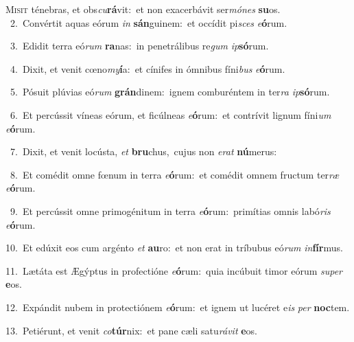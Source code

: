 \lettrine{\initial\textcolor{\initialcolor}{M}}{isit} ténebras, et obs\-\textit{cu}\-\textbf{rá}vit:~\star et non exacerbávit ser\-\textit{mó}\-\textit{nes} \textbf{su}\-os.\\
{\numbfont\textcolor{\numbcolor}{~2.}}~Convértit aquas eórum \textit{in} \textbf{sán}\-guinem:~\star et occídit pi\textit{sces} \textit{e}\-\textbf{ó}rum.\par
{\numbfont\textcolor{\numbcolor}{~3.}}~Edidit terra eó\textit{rum} \textbf{ra}\-nas:~\star in penetrálibus re\textit{gum} \textit{ip}\-\textbf{só}rum.\par
{\numbfont\textcolor{\numbcolor}{~4.}}~Dixit, et venit cœno\-\textit{my}\-\textbf{í}a:~\star et cínifes in ómnibus fíni\textit{bus} \textit{e}\-\textbf{ó}rum.\par
{\numbfont\textcolor{\numbcolor}{~5.}}~Pósuit plúvias eó\textit{rum} \textbf{grán}\-dinem:~\star ignem comburéntem in ter\textit{ra} \textit{ip}\-\textbf{só}rum.\par
{\numbfont\textcolor{\numbcolor}{~6.}}~Et percússit víneas eórum, et ficúlneas \textit{e}\-\textbf{ó}rum:~\star et contrívit lignum fíni\textit{um} \textit{e}\-\textbf{ó}rum.\par
{\numbfont\textcolor{\numbcolor}{~7.}}~Dixit, et venit locústa, \textit{et} \textbf{bru}\-chus,~\star cujus non \textit{e}\-\textit{rat} \textbf{nú}\-merus:\par
{\numbfont\textcolor{\numbcolor}{~8.}}~Et comédit omne fœnum in terra \textit{e}\-\textbf{ó}rum:~\star et comédit omnem fructum ter\textit{ræ} \textit{e}\-\textbf{ó}rum.\par
{\numbfont\textcolor{\numbcolor}{~9.}}~Et percússit omne primogénitum in terra \textit{e}\-\textbf{ó}rum:~\star primítias omnis labó\textit{ris} \textit{e}\-\textbf{ó}rum.\par
{\numbfont\textcolor{\numbcolor}{10.}}~Et edúxit eos cum argénto \textit{et} \textbf{au}\-ro:~\star et non erat in tríbubus eó\textit{rum} \textit{in}\-\textbf{fír}mus.\par
{\numbfont\textcolor{\numbcolor}{11.}}~Lætáta est Ægýptus in profectióne \textit{e}\-\textbf{ó}rum:~\star quia incúbuit timor eórum \textit{su}\-\textit{per} \textbf{e}\-os.\par
{\numbfont\textcolor{\numbcolor}{12.}}~Expándit nubem in protectiónem \textit{e}\-\textbf{ó}rum:~\star et ignem ut lucéret e\textit{is} \textit{per} \textbf{noc}\-tem.\par
{\numbfont\textcolor{\numbcolor}{13.}}~Petiérunt, et venit \textit{co}\-\textbf{túr}nix:~\star et pane cæli satu\-\textit{rá}\-\textit{vit} \textbf{e}\-os.\par

